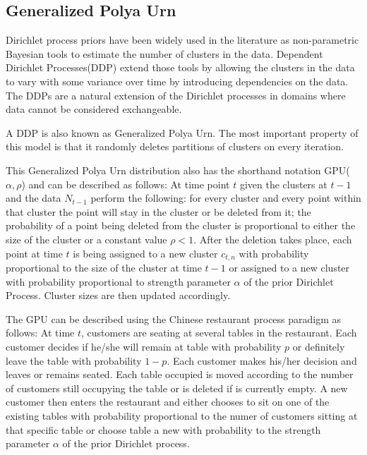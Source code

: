 \documentclass[twoside,hidelinks]{article}
\begin{document}
\subsection{Generalized Polya Urn}


Dirichlet process priors have been widely used in the literature as non-parametric Bayesian tools to estimate the number of clusters in the data\cite{antoniak}. Dependent Dirichlet Processes(DDP) extend those tools by allowing the clusters in the data to vary with some variance over time by introducing dependencies on the data. The DDPs are a natural extension of the Dirichlet processes in domains where data cannot be considered exchangeable. 

A DDP is also known as Generalized Polya Urn\cite{caron}. The most important property of this model is that it randomly deletes partitions of clusters on every iteration. 


This Generalized Polya Urn distribution also has the shorthand notation GPU($\alpha,\rho$) and can be described as follows: At time point $t$ given the clusters at $t-1$ and the data $N_{t-1}$ perform the following: for every cluster and every point within that cluster the point will stay in the cluster or be deleted from it; the probability of a point being deleted from the cluster is proportional to either the size of the cluster or a constant value $\rho <1$\cite{caron}. After the deletion takes place, each point at time $t$ is being assigned to a new cluster $c_{t,n}$  with probability proportional to the size of the cluster at time $t-1$ or assigned to a new cluster with probability proportional to strength parameter $\alpha$ of the prior Dirichlet Process. Cluster sizes are then updated accordingly.


The GPU can be described using the Chinese restaurant process paradigm as follows: At time $t$, customers are seating at several tables in the restaurant. Each customer decides if he/she will remain at table with probability $p$ or definitely leave the table with probability $1-p$. Each customer makes his/her decision and leaves or remains seated. Each table occupied is moved according to the number of customers still occupying the table or is deleted if is currently empty. A new customer then enters the restaurant and either chooses to sit on one of the existing tables with probability proportional to the numer of customers sitting at that specific table or choose table a new with probability to the strength parameter $\alpha$ of the prior Dirichlet process.
\end{document}
